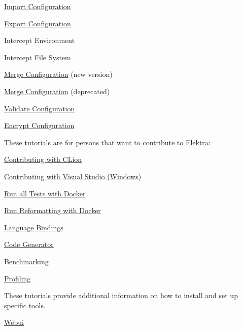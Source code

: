 \begin{DoxyItemize}
\item \hyperlink{doc_tutorials_import_md}{Import Configuration}
\item \hyperlink{doc_tutorials_export_md}{Export Configuration}
\item Intercept Environment
\item Intercept File System
\item \hyperlink{doc_tutorials_cmerge_md}{Merge Configuration} (new version)
\item \hyperlink{doc_tutorials_merge_md}{Merge Configuration} (deprecated)
\item \hyperlink{doc_tutorials_validation_md}{Validate Configuration}
\item \hyperlink{doc_tutorials_crypto_md}{Encrypt Configuration}
\end{DoxyItemize}

These tutorials are for persons that want to contribute to Elektra\+:


\begin{DoxyItemize}
\item \hyperlink{doc_tutorials_contributing-clion_md}{Contributing with C\+Lion}
\item \hyperlink{doc_tutorials_contributing-windows_md}{Contributing with Visual Studio (Windows)}
\item \hyperlink{doc_tutorials_run_all_tests_with_docker_md}{Run all Tests with Docker}
\item \hyperlink{doc_tutorials_run_reformatting_script_with_docker_md}{Run Reformatting with Docker}
\item \hyperlink{doc_tutorials_language-bindings_md}{Language Bindings}
\item \hyperlink{doc_tutorials_code-generator_md}{Code Generator}
\item \hyperlink{doc_tutorials_benchmarking_md}{Benchmarking}
\item \hyperlink{doc_tutorials_profiling_md}{Profiling}
\end{DoxyItemize}

These tutorials provide additional information on how to install and set up specific tools.


\begin{DoxyItemize}
\item \hyperlink{doc_tutorials_install-webui_md}{Webui} 
\end{DoxyItemize}